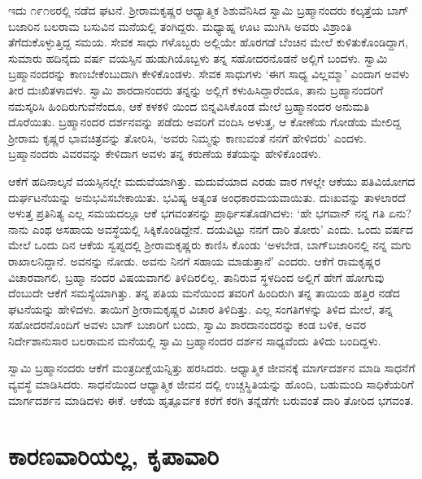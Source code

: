 ಇದು ೧೯೧೮ರಲ್ಲಿ ನಡೆದ ಘಟನೆ. ಶ‍್ರೀರಾಮಕೃಷ್ಣರ ಆಧ್ಯಾತ್ಮಿಕ ಶಿಶುವೆನಿಸಿದ ಸ್ವಾಮಿ ಬ್ರಹ್ಮಾನಂದರು ಕಲ್ಕತ್ತೆಯ ಬಾಗ್​ಬಜಾರಿನ ಬಲರಾಮ ಬಸುವಿನ ಮನೆಯಲ್ಲಿ ತಂಗಿದ್ದರು. ಮಧ್ಯಾಹ್ನ ಊಟ ಮುಗಿಸಿ ಅವರು ವಿಶ್ರಾಂತಿ ತೆಗೆದುಕೊಳ್ಳುತ್ತಿದ್ದ ಸಮಯ. ಸೇವಕ ಸಾಧು ಗಳೊಬ್ಬರು ಅಲ್ಲಿಯೇ ಹೊರಗಡೆ ಬೆಂಚಿನ ಮೇಲೆ ಕುಳಿತುಕೊಂಡಿದ್ದಾಗ, ಸುಮಾರು ಹದಿನೈದು ವರ್ಷ ವಯಸ್ಸಿನ ಹುಡುಗಿಯೊಬ್ಬಳು ತನ್ನ ಸಹೋದರನೊಡನೆ ಅಲ್ಲಿಗೆ ಬಂದಳು. ಸ್ವಾಮಿ ಬ್ರಹ್ಮಾನಂದರನ್ನು ಕಾಣಬೇಕೆಂಬುದಾಗಿ ಕೇಳಿಕೊಂಡಳು. ಸೇವಕ ಸಾಧುಗಳು ‘ಈಗ ಸಾಧ್ಯ ವಿಲ್ಲಮ್ಮಾ’ ಎಂದಾಗ ಅವಳು ತೀರ ದುಃಖಿತಳಾದಳು. ಸ್ವಾಮಿ ಶಾರದಾನಂದರು ತನ್ನನ್ನು ಅಲ್ಲಿಗೆ ಕಳುಹಿಸಿದ್ದಾರೆಂದೂ, ತಾನು ಬ್ರಹ್ಮಾನಂದರಿಗೆ ನಮಸ್ಕರಿಸಿ ಹಿಂದಿರುಗುವೆನೆಂದೂ, ಆಕೆ ಕಳಕಳಿ ಯಿಂದ ಬಿನ್ನವಿಸಿಕೊಂಡ ಮೇಲೆ ಬ್ರಹ್ಮಾನಂದರ ಅನುಮತಿ ದೊರೆಯಿತು. ಬ್ರಹ್ಮಾನಂದರ ದರ್ಶನವನ್ನು ಪಡೆದು ಅವರಿಗೆ ವಂದಿಸಿ ಅಳುತ್ತ, ಆ ಕೋಣೆಯ ಗೋಡೆಯ ಮೇಲಿದ್ದ ಶ‍್ರೀರಾಮ ಕೃಷ್ಣರ ಭಾವಚಿತ್ರವನ್ನು ತೋರಿಸಿ, ‘ಅವರು ನಿಮ್ಮನ್ನು ಕಾಣುವಂತೆ ನನಗೆ ಹೇಳಿದರು’ ಎಂದಳು. ಬ್ರಹ್ಮಾನಂದರು ವಿವರವನ್ನು ಕೇಳಿದಾಗ ಅವಳು ತನ್ನ ಕರುಣೆಯ ಕತೆಯನ್ನು ಹೇಳಿಕೊಂಡಳು.

ಆಕೆಗೆ ಹದಿನಾಲ್ಕನೆ ವಯಸ್ಸಿನಲ್ಲೇ ಮದುವೆಯಾಗಿತ್ತು. ಮದುವೆಯಾದ ಎರಡು ವಾರ ಗಳಲ್ಲೇ ಆಕೆಯು ಪತಿವಿಯೋಗದ ದುರ್ಘಟನೆಯನ್ನು ಅನುಭವಿಸಬೇಕಾಯಿತು. ಭವಿಷ್ಯ ಅತ್ಯಂತ ಅಂಧಕಾರಮಯವಾಯಿತು. ದುಃಖವನ್ನು ತಾಳಲಾರದೆ ಅಳುತ್ತ ಪ್ರತಿನಿತ್ಯ ಎಲ್ಲ ಸಮಯದಲ್ಲೂ ಆಕೆ ಭಗವಂತನನ್ನು ಪ್ರಾರ್ಥಿಸತೊಡಗಿದಳು: ‘ಹೇ ಭಗವಾನ್ ನನ್ನ ಗತಿ ಏನು? ನಾನು ಎಂಥ ಅಸಹಾಯ ಅವಸ್ಥೆಯಲ್ಲಿ ಸಿಕ್ಕಿಕೊಂಡಿದ್ದೇನೆ. ದಯವಿಟ್ಟು ನನಗೆ ದಾರಿ ತೋರು’ ಎಂದು. ಒಂದು ವರ್ಷದ ಮೇಲೆ ಒಂದು ದಿನ ಆಕೆಯ ಸ್ವಪ್ನದಲ್ಲಿ ಶ‍್ರೀರಾಮಕೃಷ್ಣರು ಕಾಣಿಸಿ ಕೊಂಡು ‘ಅಳಬೇಡ, ಬಾಗ್​ಬಜಾರಿನಲ್ಲಿ ನನ್ನ ಮಗು ರಾಖಾಲನಿದ್ದಾನೆ. ಅವನನ್ನು ನೋಡು. ಅವನು ನಿನಗೆ ಸಹಾಯ ಮಾಡುತ್ತಾನೆ’ ಎಂದರು. ಆಕೆಗೆ ರಾಮಕೃಷ್ಣರ ವಿಚಾರವಾಗಲಿ, ಬ್ರಹ್ಮಾ ನಂದರ ವಿಷಯವಾಗಲಿ ತಿಳಿದಿರಲಿಲ್ಲ. ತಾನಿರುವ ಸ್ಥಳದಿಂದ ಅಲ್ಲಿಗೆ ಹೇಗೆ ಹೋಗುವು ದೆಂಬುದೇ ಆಕೆಗೆ ಸಮಸ್ಯೆಯಾಗಿತ್ತು. ತನ್ನ ಪತಿಯ ಮನೆಯಿಂದ ತವರಿಗೆ ಹಿಂದಿರುಗಿ ತನ್ನ ತಾಯಿಯ ಹತ್ತಿರ ನಡೆದ ಘಟನೆಯನ್ನು ಹೇಳಿದಳು. ತಾಯಿಗೆ ಶ‍್ರೀರಾಮಕೃಷ್ಣರ ವಿಚಾರ ತಿಳಿದಿತ್ತು. ಎಲ್ಲ ಸಂಗತಿಗಳನ್ನು ತಿಳಿದ ಮೇಲೆ, ತನ್ನ ಸಹೋದರನೊಂದಿಗೆ ಅವಳು ಬಾಗ್ ಬಜಾರಿಗೆ ಬಂದು, ಸ್ವಾಮಿ ಶಾರದಾನಂದರನ್ನು ಕಂಡ ಬಳಿಕ, ಅವರ ನಿರ್ದೇಶಾನುಸಾರ ಬಲರಾಮನ ಮನೆಯಲ್ಲಿ ಸ್ವಾಮಿ ಬ್ರಹ್ಮಾನಂದರ ದರ್ಶನ ಸಾಧ್ಯವೆಂದು ತಿಳಿದು ಬಂದಿದ್ದಳು.

ಸ್ವಾಮಿ ಬ್ರಹ್ಮಾನಂದರು ಆಕೆಗೆ ಮಂತ್ರದೀಕ್ಷೆಯನ್ನಿತ್ತು ಹರಸಿದರು. ಆಧ್ಯಾತ್ಮಿಕ ಜೀವನಕ್ಕೆ ಮಾರ್ಗದರ್ಶನ ಮಾಡಿ ಸಾಧನೆಗೆ ವ್ಯವಸ್ಥೆ ಮಾಡಿಸಿದರು. ಸಾಧನೆಯಿಂದ ಆಧ್ಯಾತ್ಮಿಕ ಜೀವನ ದಲ್ಲಿ ಉಚ್ಚಸ್ಥಿತಿಯನ್ನು ಹೊಂದಿ, ಬಹುಮಂದಿ ಸಾಧಿಕೆಯರಿಗೆ ಮಾರ್ಗದರ್ಶನ ಮಾಡಿದಳು ಈಕೆ. ಆಕೆಯ ಹೃತ್ಪೂರ್ವಕ ಕರೆಗೆ ಕರಗಿ ತನ್ನೆಡೆಗೇ ಬರುವಂತೆ ದಾರಿ ತೋರಿದ ಭಗವಂತ.


\section{ಕಾರಣವಾರಿಯಲ್ಲ, ಕೃಪಾವಾರಿ}

